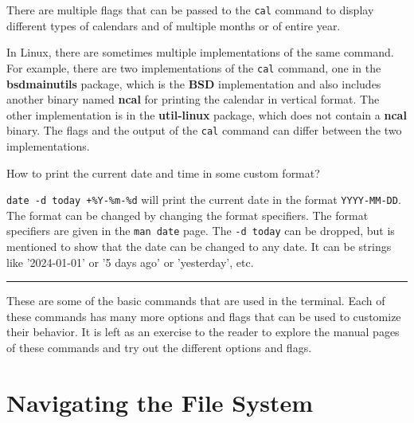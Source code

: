 There are multiple flags that can be passed to the \texttt{cal} command to display different types of calendars and of multiple months or of entire year.

\begin{remark}
  In Linux, there are sometimes multiple implementations of the same command.
  For example, there are two implementations of the \texttt{cal} command, one in the \textbf{bsdmainutils} package, which is the \textbf{BSD} implementation and also includes another binary named \textbf{ncal} for printing the calendar in vertical format.
  The other implementation is in the \textbf{util-linux} package, which does not contain a \textbf{ncal} binary.
  The flags and the output of the \texttt{cal} command can differ between the two implementations.
\end{remark}

\begin{qs}
  How to print the current date and time in some custom format?
\end{qs}

\begin{ans}
  \texttt{date -d today +\%Y-\%m-\%d} will print the current date in the format
  \texttt{YYYY-MM-DD}. The format can be changed by changing the format specifiers.
  The format specifiers are given in the \texttt{man date} page. The \texttt{-d today} can
  be dropped, but is mentioned to show that the date can be changed to any date.
  It can be strings like '2024-01-01' or '5 days ago' or 'yesterday', etc.
\end{ans}

\vspace{5mm}
\hrule
\vspace{3mm}

These are some of the basic commands that are used in the terminal.
Each of these commands has many more options and flags that can be used to customize their behavior.
It is left as an exercise to the reader to explore the manual pages of these commands and try out the different options and flags.


\vfill
\pagebreak
\section{Navigating the File System}

